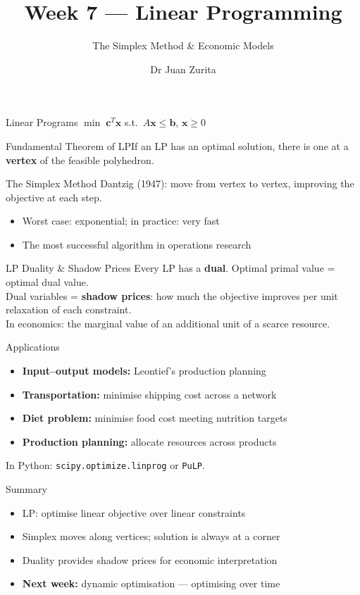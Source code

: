 \documentclass[aspectratio=169, 10pt]{beamer}
\title{Week 7 --- Linear Programming}
\subtitle{The Simplex Method \& Economic Models}
\author{Dr Juan Zurita}
\institute{Optimisation \& Mathematical Methods for Economics\\
The University of Edinburgh~$\cdot$~School of Economics}
\date{}
\begin{document}
\maketitle

\begin{frame}{Linear Programs}
$\min\;\mathbf{c}^T\mathbf{x}$ s.t.\ $A\mathbf{x} \leq \mathbf{b}$, $\mathbf{x} \geq 0$\\\bigskip\begin{block}{Fundamental Theorem of LP}If an LP has an optimal solution, there is one at a \textbf{vertex} of the feasible polyhedron.\end{block}
\end{frame}

\begin{frame}{The Simplex Method}
Dantzig (1947): move from vertex to vertex, improving the objective at each step.\\\bigskip\begin{itemize}\item Worst case: exponential; in practice: very fast\item The most successful algorithm in operations research\end{itemize}
\end{frame}

\begin{frame}{LP Duality \& Shadow Prices}
Every LP has a \textbf{dual}. Optimal primal value = optimal dual value.\\\bigskip Dual variables = \textbf{shadow prices}: how much the objective improves per unit relaxation of each constraint.\\\bigskip In economics: the marginal value of an additional unit of a scarce resource.
\end{frame}

\begin{frame}{Applications}
\begin{itemize}\item \textbf{Input--output models:} Leontief's production planning\item \textbf{Transportation:} minimise shipping cost across a network\item \textbf{Diet problem:} minimise food cost meeting nutrition targets\item \textbf{Production planning:} allocate resources across products\end{itemize}\par\bigskip In Python: \texttt{scipy.optimize.linprog} or \texttt{PuLP}.
\end{frame}

\begin{frame}{Summary}
\begin{itemize}\item LP: optimise linear objective over linear constraints\item Simplex moves along vertices; solution is always at a corner\item Duality provides shadow prices for economic interpretation\item \textbf{Next week:} dynamic optimisation --- optimising over time\end{itemize}
\end{frame}
\end{document}
